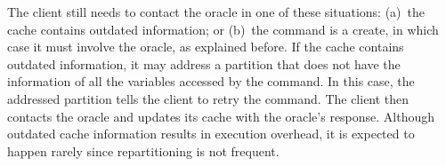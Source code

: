 The client still needs to contact the oracle in one of these situations:
(a)~the cache contains outdated information; or
(b)~the command is a create, in which case it must involve the oracle, as explained before.
If the cache contains outdated information, it may address a partition that does not have the information of all the variables accessed by the command.
In this case, the addressed partition tells the client to retry the command.
The client then contacts the oracle and updates its cache with the oracle's response.
Although outdated cache information results in execution overhead, it is expected to happen rarely since repartitioning is not frequent.






